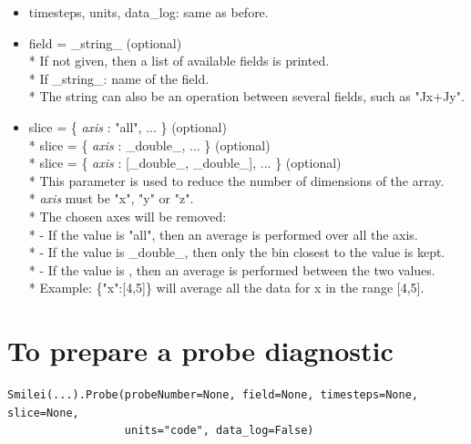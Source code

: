 \documentclass[11pt]{article}
\newcommand{\code}[1]{\colorbox{yellow!15}{\ttfamily #1}}
\newcommand{\val}[1]{{\ttfamily \textit{#1}}}
\begin{document}
\begin{itemize}
\item \code{timesteps}, \code{units}, \code{data\_log}: same as before.
\item \code{field} = \code{\_string\_} (optional)\\*
	If not given, then a list of available fields is printed.\\*
	If \code{\_string\_}: name of the field.\\*
	The string can also be an operation between several fields, such as \code{"Jx+Jy"}.
\item \code{slice} = \code{\{ \val{axis} : "all", ... \}}                 (optional)\\*
	\code{slice} = \code{\{ \val{axis} : \_double\_, ... \}}              (optional)\\*
	\code{slice} = \code{\{ \val{axis} : [\_double\_, \_double\_], ... \}}  (optional)\\*
	This parameter is used to reduce the number of dimensions of the array.\\*
	\val{axis} must be \code{"x"}, \code{"y"} or \code{"z"}.\\*
	 The chosen axes will be removed:\\*
	- If the value is \code{"all"}, then an average is performed over all the axis.\\*
	- If the value is \code{\_double\_}, then only the bin closest to the value is kept.\\*
	- If the value is \code{[\_double\_,\_double\_]}, then an average is performed between the two values.\\*
	Example: \code{\{"x":[4,5]\}} will average all the data for x in the range [4,5].
\end{itemize}
\vspace{0.5cm}


\section{To prepare a probe diagnostic}

\begin{lstlisting}
Smilei(...).Probe(probeNumber=None, field=None, timesteps=None, slice=None,
                  units="code", data_log=False)
\end{lstlisting}
\end{document}
